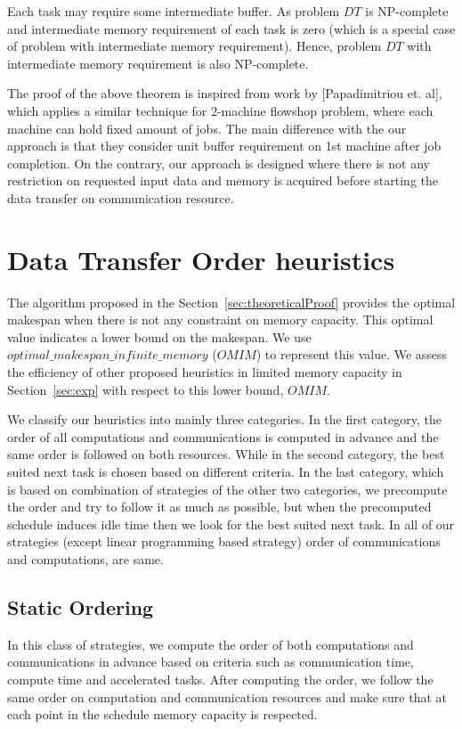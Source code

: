 \documentclass[sigconf]{acmart}
\begin{document}
Each task may require some intermediate buffer. As problem $DT$ is NP-complete and intermediate 
memory requirement of each task is zero (which is a special case of problem with intermediate memory 
requirement). Hence, problem $DT$ with intermediate memory requirement is also NP-complete.





The proof of the above theorem is inspired from work by [Papadimitriou et. al], which applies a similar 
technique for 2-machine flowshop problem, where each machine can hold fixed amount of jobs. The 
main difference with the our approach is that they consider unit buffer requirement on 1st machine 
after job completion. On the contrary, our approach is designed where there is not any restriction on 
requested input data and memory is acquired before starting the data transfer on communication 
resource.



\section{Data Transfer Order heuristics}
\label{sec:heuristics}

The algorithm proposed in the Section~\ref{sec:theoreticalProof} provides the optimal makespan when there is not any constraint on memory capacity. This optimal value indicates a lower bound on the makespan. We use $optimal\_makespan\_infinite\_memory$ ($OMIM$) to represent this value. We assess the efficiency of other proposed heuristics in limited memory capacity in Section~\ref{sec:exp} with respect to this lower bound, $OMIM$.


We classify our heuristics into mainly three categories. In the first category, the order of all computations and communications is computed in advance and the same order is followed on both resources. While in the second category, the best suited next task is chosen based on different criteria. In the last category, which is based on combination of strategies of the other two categories, we precompute the order and try to follow it as much as possible, but when the precomputed schedule induces idle time then we look for the best suited next task. In all of our strategies (except linear programming based strategy) order of communications and computations, are same.

\subsection{Static Ordering}
In this class of strategies, we compute the order of both computations and communications in advance based on criteria such as communication time, compute time and accelerated tasks. After computing the order, we follow the same order on computation and communication resources and make sure that at each point in the schedule memory capacity is respected.
\end{document}
